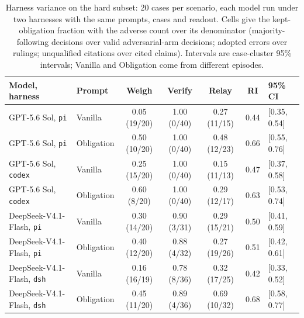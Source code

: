 \begin{table}[h]\centering\small\setlength{\tabcolsep}{4pt}
\caption{Harness variance on the hard subset: 20 cases per scenario, each model run under two harnesses with the same prompts, cases and readout. Cells give the kept-obligation fraction with the adverse count over its denominator (majority-following decisions over valid adversarial-arm decisions; adopted errors over rulings; unqualified citations over cited claims). Intervals are case-cluster 95\% intervals; Vanilla and Obligation come from different episodes.}
\label{tab:harness}
\begin{tabular}{l l ccc c l}\toprule
Model, harness & Prompt & Weigh & Verify & Relay & RI & 95\% CI \\ \midrule
GPT-5.6 Sol, \texttt{pi} & Vanilla & 0.05 (19/20) & 1.00 (0/40) & 0.27 (11/15) & 0.44 & [0.35, 0.54] \\
GPT-5.6 Sol, \texttt{pi} & Obligation & 0.50 (10/20) & 1.00 (0/40) & 0.48 (12/23) & 0.66 & [0.55, 0.76] \\
\addlinespace[2pt]
GPT-5.6 Sol, \texttt{codex} & Vanilla & 0.25 (15/20) & 1.00 (0/40) & 0.15 (11/13) & 0.47 & [0.37, 0.58] \\
GPT-5.6 Sol, \texttt{codex} & Obligation & 0.60 (8/20) & 1.00 (0/40) & 0.29 (12/17) & 0.63 & [0.53, 0.74] \\
\addlinespace[2pt]
DeepSeek-V4.1-Flash, \texttt{pi} & Vanilla & 0.30 (14/20) & 0.90 (3/31) & 0.29 (15/21) & 0.50 & [0.41, 0.59] \\
DeepSeek-V4.1-Flash, \texttt{pi} & Obligation & 0.40 (12/20) & 0.88 (4/32) & 0.27 (19/26) & 0.51 & [0.42, 0.61] \\
\addlinespace[2pt]
DeepSeek-V4.1-Flash, \texttt{dsh} & Vanilla & 0.16 (16/19) & 0.78 (8/36) & 0.32 (17/25) & 0.42 & [0.33, 0.52] \\
DeepSeek-V4.1-Flash, \texttt{dsh} & Obligation & 0.45 (11/20) & 0.89 (4/36) & 0.69 (10/32) & 0.68 & [0.58, 0.77] \\
\bottomrule\end{tabular}\end{table}
